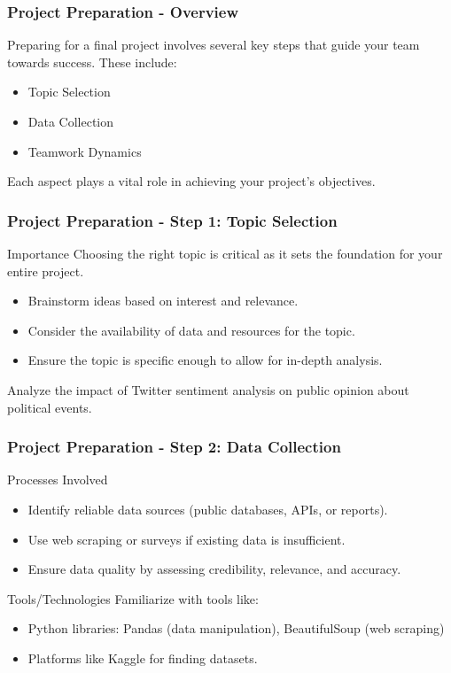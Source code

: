 \documentclass{beamer}
\begin{document}
\begin{frame}[fragile]
    \frametitle{Project Preparation - Overview}
    Preparing for a final project involves several key steps that guide your team towards success. These include:
    \begin{itemize}
        \item Topic Selection
        \item Data Collection
        \item Teamwork Dynamics
    \end{itemize}
    Each aspect plays a vital role in achieving your project's objectives.
\end{frame}

\begin{frame}[fragile]
    \frametitle{Project Preparation - Step 1: Topic Selection}
    \begin{block}{Importance}
        Choosing the right topic is critical as it sets the foundation for your entire project.
    \end{block}
    \begin{itemize}
        \item Brainstorm ideas based on interest and relevance.
        \item Consider the availability of data and resources for the topic.
        \item Ensure the topic is specific enough to allow for in-depth analysis.
    \end{itemize}
    \begin{example}[Example]
        Analyze the impact of Twitter sentiment analysis on public opinion about political events.
    \end{example}
\end{frame}

\begin{frame}[fragile]
    \frametitle{Project Preparation - Step 2: Data Collection}
    \begin{block}{Processes Involved}
        \begin{itemize}
            \item Identify reliable data sources (public databases, APIs, or reports).
            \item Use web scraping or surveys if existing data is insufficient.
            \item Ensure data quality by assessing credibility, relevance, and accuracy.
        \end{itemize}
    \end{block}
    \begin{block}{Tools/Technologies}
        Familiarize with tools like:
        \begin{itemize}
            \item Python libraries: Pandas (data manipulation), BeautifulSoup (web scraping)
            \item Platforms like Kaggle for finding datasets.
        \end{itemize}
    \end{block}
\end{frame}
\end{document}
